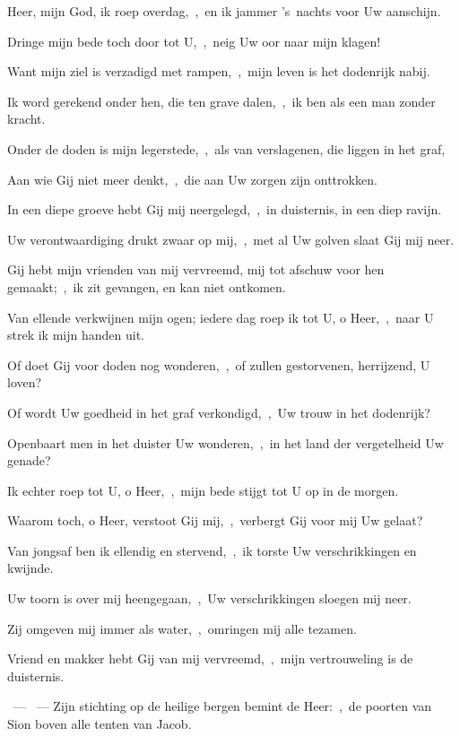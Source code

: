 \documentclass[12pt,twoside,a5paper]{article}
\begin{document}
\begin{halfparskip}
   Heer, mijn God, ik roep overdag,~\sep\ en ik jammer 's~nachts voor Uw aanschijn.

  Dringe mijn bede toch door tot U,~\sep\ neig Uw oor naar mijn klagen!

  Want mijn ziel is verzadigd met rampen,~\sep\ mijn leven is het dodenrijk nabij.

  Ik word gerekend onder hen, die ten grave dalen,~\sep\ ik ben als een man zonder kracht.

  Onder de doden is mijn legerstede,~\sep\ als van verslagenen, die liggen in het graf,

  Aan wie Gij niet meer denkt,~\sep\ die aan Uw zorgen zijn onttrokken.

  In een diepe groeve hebt Gij mij neergelegd,~\sep\ in duisternis, in een diep ravijn.

  Uw verontwaardiging drukt zwaar op mij,~\sep\ met al Uw golven slaat Gij mij neer.

  Gij hebt mijn vrienden van mij vervreemd, mij tot afschuw voor hen gemaakt;~\sep\ ik zit gevangen, en kan niet ontkomen.

  Van ellende verkwijnen mijn ogen; iedere dag roep ik tot U, o Heer,~\sep\ naar U strek ik mijn handen uit.

  Of doet Gij voor doden nog wonderen,~\sep\ of zullen gestorvenen, herrijzend, U loven?

  Of wordt Uw goedheid in het graf verkondigd,~\sep\ Uw trouw in het dodenrijk?

  Openbaart men in het duister Uw wonderen,~\sep\ in het land der vergetelheid Uw genade?

  Ik echter roep tot U, o Heer,~\sep\ mijn bede stijgt tot U op in de morgen.

  Waarom toch, o Heer, verstoot Gij mij,~\sep\ verbergt Gij voor mij Uw gelaat?

  Van jongsaf ben ik ellendig en stervend,~\sep\ ik torste Uw verschrikkingen en kwijnde.

  Uw toorn is over mij heengegaan,~\sep\ Uw verschrikkingen sloegen mij neer.

  Zij omgeven mij immer als water,~\sep\ omringen mij alle tezamen.

  Vriend en makker hebt Gij van mij vervreemd,~\sep\ mijn vertrouweling is de duisternis.
\end{halfparskip}

\begin{halfparskip}
  ~--- ~---  Zijn stichting op de heilige bergen bemint de Heer:~\sep\ de poorten van Sion
  boven alle tenten van Jacob.
\end{halfparskip}
\end{document}
